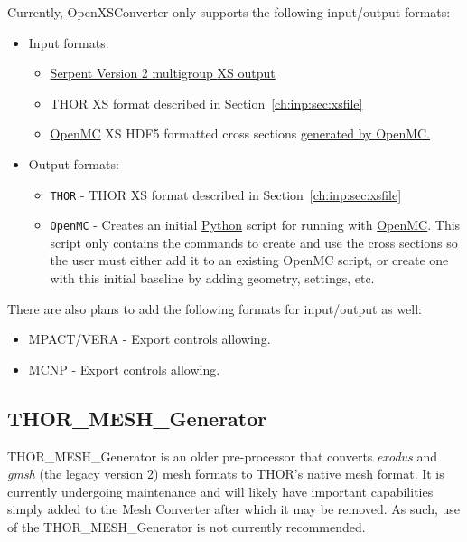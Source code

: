 Currently, OpenXSConverter only supports the following input/output formats:
\begin{itemize}
  \item Input formats:
    \begin{itemize}
      \item \href{https://serpent.vtt.fi/mediawiki/index.php/Description_of_output_files}{Serpent Version 2 multigroup \ac{XS} output}
      \item THOR \ac{XS} format described in Section~\ref{ch:inp:sec:xsfile}
      \item \href{https://docs.openmc.org/en/stable/}{OpenMC} \ac{XS} HDF5 formatted cross sections \href{https://nbviewer.org/github/openmc-dev/openmc-notebooks/blob/main/mgxs-part-i.ipynb}{generated by OpenMC.}
    \end{itemize}
  \item Output formats:
    \begin{itemize}
      \item \verb"THOR" - THOR \ac{XS} format described in Section~\ref{ch:inp:sec:xsfile}
      \item \verb"OpenMC" - Creates an initial \href{https://www.python.org/}{Python} script for running with \href{https://docs.openmc.org/en/stable/}{OpenMC}.
        This script only contains the commands to create and use the cross sections so the user must either add it to an existing OpenMC script, or create one with this initial baseline by adding geometry, settings, etc.
    \end{itemize}
\end{itemize}
There are also plans to add the following formats for input/output as well:
\begin{itemize}
  \item MPACT/VERA - Export controls allowing.
  \item MCNP - Export controls allowing.
\end{itemize}

\subsection{THOR\_MESH\_Generator}

THOR\_MESH\_Generator is an older pre-processor that converts \textit{exodus} and \textit{gmsh} (the legacy version 2) mesh formats to \ac{THOR}'s native mesh format.
It is currently undergoing maintenance and will likely have important capabilities simply added to the Mesh Converter after which it may be removed.
As such, use of the THOR\_MESH\_Generator is not currently recommended.

